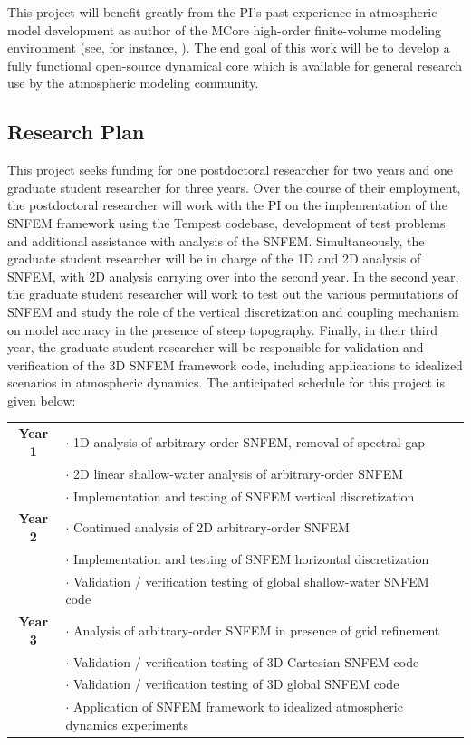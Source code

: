 \documentclass[11pt]{article}
\begin{document}
This project will benefit greatly from the PI's past experience in atmospheric model development as author of the MCore high-order finite-volume modeling environment (see, for instance, \cite{PAUCJBVL2010JCP,PAUCJ2012MWR,PAUCJ2012JCP}).  The end goal of this work will be to develop a fully functional open-source dynamical core which is available for general research use by the atmospheric modeling community.

\subsection{Research Plan} \label{sec:ResearchPlan}

This project seeks funding for one postdoctoral researcher for two years and one graduate student researcher for three years.  Over the course of their employment, the postdoctoral researcher will work with the PI on the implementation of the SNFEM framework using the Tempest codebase, development of test problems and additional assistance with analysis of the SNFEM.  Simultaneously, the graduate student researcher will be in charge of the 1D and 2D analysis of SNFEM, with 2D analysis carrying over into the second year.  In the second year, the graduate student researcher will work to test out the various permutations of SNFEM and study the role of the vertical discretization and coupling mechanism on model accuracy in the presence of steep topography.  Finally, in their third year, the graduate student researcher will be responsible for validation and verification of the 3D SNFEM framework code, including applications to idealized scenarios in atmospheric dynamics.  The anticipated schedule for this project is given below:

\begin{tabularx}{\textwidth}{cX}
\hline
\textbf{Year 1} & $\cdot$ 1D analysis of arbitrary-order SNFEM, removal of spectral gap \\
& $\cdot$ 2D linear shallow-water analysis of arbitrary-order SNFEM \\
& $\cdot$ Implementation and testing of SNFEM vertical discretization \\
\hline
\textbf{Year 2} & $\cdot$ Continued analysis of 2D arbitrary-order SNFEM \\
& $\cdot$ Implementation and testing of SNFEM horizontal discretization \\
& $\cdot$ Validation / verification testing of global shallow-water SNFEM code \\
\hline
\textbf{Year 3} & $\cdot$ Analysis of arbitrary-order SNFEM in presence of grid refinement \\
& $\cdot$ Validation / verification testing of 3D Cartesian SNFEM code \\
& $\cdot$ Validation / verification testing of 3D global SNFEM code \\
& $\cdot$ Application of SNFEM framework to idealized atmospheric dynamics experiments \\
\hline
\end{tabularx}
\end{document}
